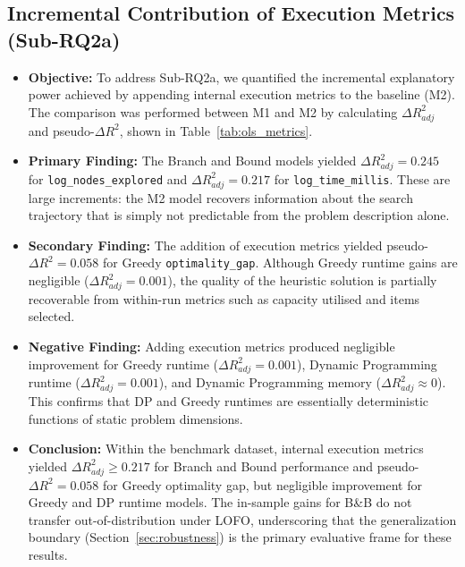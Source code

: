 \documentclass[sigconf]{acmart}
\begin{document}
\subsection{Incremental Contribution of Execution Metrics (Sub-RQ2a)}
\begin{itemize}
  \item \textbf{Objective:} To address Sub-RQ2a, we quantified the incremental explanatory power achieved by appending internal execution metrics to the baseline (M2). The comparison was performed between M1 and M2 by calculating $\Delta R^2_{adj}$ and pseudo-$\Delta R^2$, shown in Table~\ref{tab:ols_metrics}.
  \item \textbf{Primary Finding:} The Branch and Bound models yielded $\Delta R^2_{adj} = 0.245$ for \texttt{log\_nodes\_explored} and $\Delta R^2_{adj} = 0.217$ for \texttt{log\_time\_millis}. These are large increments: the M2 model recovers information about the search trajectory that is simply not predictable from the problem description alone.
  \item \textbf{Secondary Finding:} The addition of execution metrics yielded pseudo-$\Delta R^2 = 0.058$ for Greedy \texttt{optimality\_gap}. Although Greedy runtime gains are negligible ($\Delta R^2_{adj} = 0.001$), the quality of the heuristic solution is partially recoverable from within-run metrics such as capacity utilised and items selected.
  \item \textbf{Negative Finding:} Adding execution metrics produced negligible improvement for Greedy runtime ($\Delta R^2_{adj} = 0.001$), Dynamic Programming runtime ($\Delta R^2_{adj} = 0.001$), and Dynamic Programming memory ($\Delta R^2_{adj} \approx 0$). This confirms that DP and Greedy runtimes are essentially deterministic functions of static problem dimensions.
  \item \textbf{Conclusion:} Within the benchmark dataset, internal execution metrics yielded $\Delta R^2_{adj} \ge 0.217$ for Branch and Bound performance and pseudo-$\Delta R^2 = 0.058$ for Greedy optimality gap, but negligible improvement for Greedy and DP runtime models. The in-sample gains for B\&B do not transfer out-of-distribution under LOFO, underscoring that the generalization boundary (Section~\ref{sec:robustness}) is the primary evaluative frame for these results.
\end{itemize}
\end{document}
